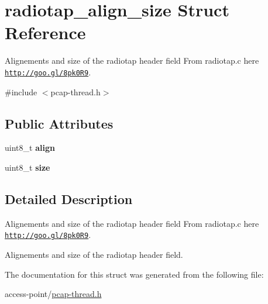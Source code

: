 \hypertarget{structradiotap__align__size}{\section{radiotap\-\_\-align\-\_\-size Struct Reference}
\label{structradiotap__align__size}
}


Alignements and size of the radiotap header field From radiotap.\-c here \href{http://goo.gl/8pk0R9}{\tt http\-://goo.\-gl/8pk0\-R9}.  




{\ttfamily \#include $<$pcap-\/thread.\-h$>$}

\subsection*{Public Attributes}
\begin{DoxyCompactItemize}
\item 
\hypertarget{structradiotap__align__size_a3f6034228a4875b0356c9cc9a668f3b7}{uint8\-\_\-t {\bfseries align}}\label{structradiotap__align__size_a3f6034228a4875b0356c9cc9a668f3b7}

\item 
\hypertarget{structradiotap__align__size_a38af123515c7a6f56f0574caaaff050d}{uint8\-\_\-t {\bfseries size}}\label{structradiotap__align__size_a38af123515c7a6f56f0574caaaff050d}

\end{DoxyCompactItemize}


\subsection{Detailed Description}
Alignements and size of the radiotap header field From radiotap.\-c here \href{http://goo.gl/8pk0R9}{\tt http\-://goo.\-gl/8pk0\-R9}. 

Alignements and size of the radiotap header field. 

The documentation for this struct was generated from the following file\-:\begin{DoxyCompactItemize}
\item 
access-\/point/\hyperlink{pcap-thread_8h}{pcap-\/thread.\-h}\end{DoxyCompactItemize}
